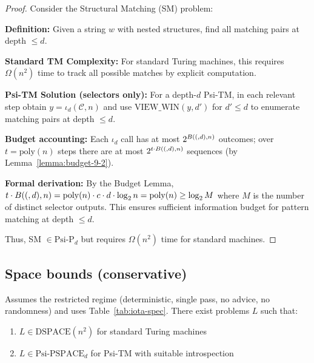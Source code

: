 \begin{proof}
Consider the Structural Matching (SM) problem:

\textbf{Definition:} Given a string $w$ with nested structures, find all matching pairs at depth $\leq d$.

\textbf{Standard TM Complexity:}
For standard Turing machines, this requires $\Omega(n^2)$ time to track all possible matches by explicit computation.

\textbf{Psi-TM Solution (selectors only):}
For a depth-$d$ Psi-TM, in each relevant step obtain $y=\iota_d(\mathcal{C},n)$ and use $\mathrm{VIEW\_WIN}(y,d')$ for $d'\le d$ to enumerate matching pairs at depth $\le d$.

\textbf{Budget accounting:}
Each $\iota_d$ call has at most $2^{B((,d),n)}$ outcomes; over $t=\mathrm{poly}(n)$ steps there are at most $2^{t \cdot B((,d),n)}$ sequences (by Lemma~\ref{lemma:budget-9-2}).

\textbf{Formal derivation:} By the Budget Lemma, $t \cdot \B(d,n) = \mathrm{poly}(n) \cdot c \cdot d \cdot \log n = \mathrm{poly}(n) \ge \log M$ where $M$ is the number of distinct selector outputs. This ensures sufficient information budget for pattern matching at depth $\le d$.

Thus, SM $\in \text{Psi-P}_d$ but requires $\Omega(n^2)$ time for standard machines.
\end{proof}

\subsection{Space bounds (conservative)}

\begin{theorem}
Assumes the restricted regime (deterministic, single pass, no advice, no randomness) and uses Table~\ref{tab:iota-spec}.
There exist problems $L$ such that:
\begin{enumerate}
\item $L \in \text{DSPACE}(n^2)$ for standard Turing machines
\item $L \in \text{Psi-PSPACE}_d$ for Psi-TM with suitable introspection
\end{enumerate}
\end{theorem}

